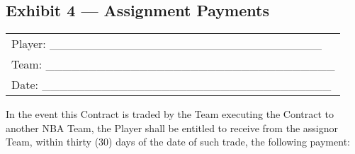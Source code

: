 \documentclass[
]{book}
\begin{document}
\newpage

\hypertarget{exhibit-4-assignment-payments}{%
\subsection{Exhibit 4 --- Assignment Payments}\label{exhibit-4-assignment-payments}}

\begin{longtable}[]{@{}l@{}}
\toprule()
\endhead
Player: \_\_\_\_\_\_\_\_\_\_\_\_\_\_\_\_\_\_\_\_\_\_\_\_\_\_\_\_\_\_\_\_ \\
Team: \_\_\_\_\_\_\_\_\_\_\_\_\_\_\_\_\_\_\_\_\_\_\_\_\_\_\_\_\_\_\_\_\_\_ \\
Date: \_\_\_\_\_\_\_\_\_\_\_\_\_\_\_\_\_\_\_\_\_\_\_\_\_\_\_\_\_\_\_\_\_\_ \\
\bottomrule()
\end{longtable}

In the event this Contract is traded by the Team executing the Contract to another NBA Team, the Player shall be entitled to receive from the assignor Team, within thirty (30) days of the date of such trade, the following payment:
\end{document}
